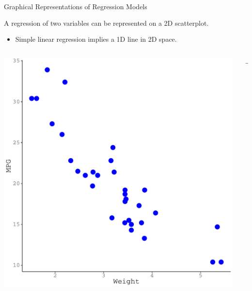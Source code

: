 \documentclass[10pt]{beamer}\usepackage[]{graphicx}\usepackage[]{color}
\makeatletter
\def\maxwidth{ %
  \ifdim\Gin@nat@width>\linewidth
    \linewidth
  \else
    \Gin@nat@width
  \fi
}
\newenvironment{knitrout}{}{} %
\makeatother
\begin{document}
\begin{frame}{Graphical Representations of Regression Models}

  A regression of two variables can be represented on a 2D scatterplot.
  \begin{itemize}
  \item Simple linear regression implies a 1D line in 2D space.
  \end{itemize}
  \vb
  \begin{columns}
    \begin{column}{0.45\textwidth}

\begin{knitrout}\footnotesize
{}\color{fgcolor}

{\centering \includegraphics[width=\maxwidth]{figure/unnamed-chunk-31-1} 

}


\end{knitrout}

\end{column}

\begin{column}{0.1\textwidth}

  \begin{center}\huge{$\rightarrow$}\end{center}


\end{column}
\end{columns}
\end{frame}
\end{document}
